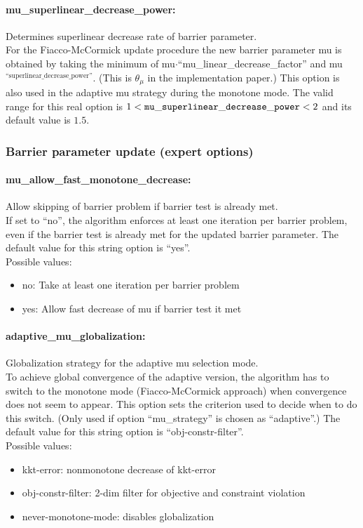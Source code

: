 \paragraph{mu\_superlinear\_decrease\_power:} Determines superlinear decrease rate of barrier parameter. $\;$ \\
 For the Fiacco-McCormick update procedure the new
barrier parameter mu is obtained by taking the
minimum of mu$\cdot$``mu\_linear\_decrease\_factor'' and
mu$^\textrm{``superlinear\_decrease\_power''}$.  (This is
$\theta_\mu$ in the implementation paper.) This option
is also used in the adaptive mu strategy during
the monotone mode. The valid range for this real option is 
$1 <  {\tt mu\_superlinear\_decrease\_power } <  2$
and its default value is $1.5$.

\subsubsection{Barrier parameter update (expert options)}

\paragraph{mu\_allow\_fast\_monotone\_decrease:} Allow skipping of barrier problem if barrier test is already met. $\;$ \\
 If set to ``no'', the algorithm enforces at least
one iteration per barrier problem, even if the
barrier test is already met for the updated
barrier parameter.
The default value for this string option is ``yes''.
\\ 
Possible values:
\begin{itemize}
   \item no: Take at least one iteration per barrier problem
   \item yes: Allow fast decrease of mu if barrier test it met
\end{itemize}

\paragraph{adaptive\_mu\_globalization:} Globalization strategy for the adaptive mu selection mode. $\;$ \\
 To achieve global convergence of the adaptive
version, the algorithm has to switch to the
monotone mode (Fiacco-McCormick approach) when
convergence does not seem to appear.  This option
sets the criterion used to decide when to do this
switch. (Only used if option ``mu\_strategy'' is
chosen as ``adaptive''.)
The default value for this string option is ``obj-constr-filter''.
\\ 
Possible values:
\begin{itemize}
   \item kkt-error: nonmonotone decrease of kkt-error
   \item obj-constr-filter: 2-dim filter for objective and constraint
violation
   \item never-monotone-mode: disables globalization
\end{itemize}

